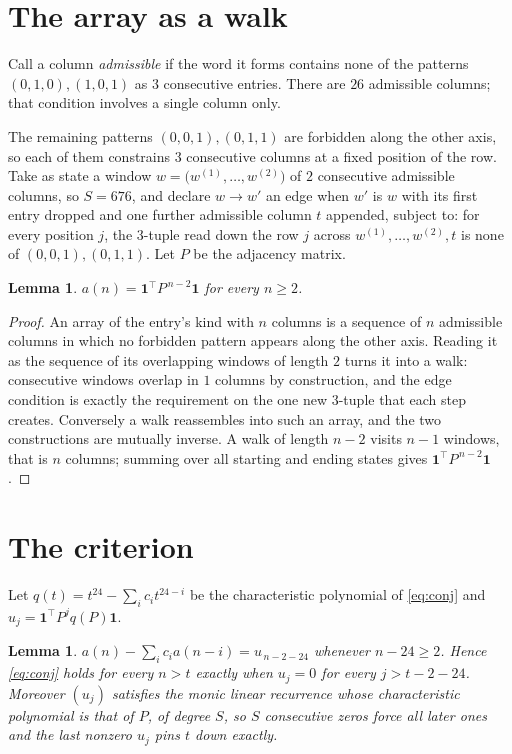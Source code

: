 \documentclass[11pt,a4paper]{article}
\theoremstyle{plain}
\newtheorem{lemma}[theorem]{Lemma}
\theoremstyle{definition}
\begin{document}
\section{The array as a walk}

Call a column \emph{admissible} if the word it forms contains none of the patterns
$(0,1,0), (1,0,1)$ as $3$ consecutive entries. There are $26$ admissible columns; that condition
involves a single column only.

The remaining patterns $(0,0,1), (0,1,1)$ are forbidden along the other axis, so each of them
constrains $3$ consecutive columns at a fixed position of the row. Take as state a
window $w=\bigl(w^{(1)},\dots,w^{(2)}\bigr)$ of $2$ consecutive admissible
columns, so $S=676$, and declare $w\to w'$ an edge when $w'$ is $w$ with its first entry
dropped and one further admissible column $t$ appended, subject to: for every position
$j$, the $3$-tuple read down the row $j$ across $w^{(1)},\dots,w^{(2)},t$
is none of $(0,0,1), (0,1,1)$. Let $P$ be the adjacency matrix.

\begin{lemma}\label{lem:walk}
$a(n)=\mathbf{1}^{\!\top}P^{\,n-2}\mathbf{1}$ for every $n\ge2$.
\end{lemma}

\begin{proof}
An array of the entry's kind with $n$ columns is a sequence of $n$ admissible columns in
which no forbidden pattern appears along the other axis. Reading it as the sequence of its
overlapping windows of length $2$ turns it into a walk: consecutive windows overlap in
$1$ columns by construction, and the edge condition is exactly the requirement on the one
new $3$-tuple that each step creates. Conversely a walk reassembles into such an array,
and the two constructions are mutually inverse. A walk of length $n-2$ visits $n-1$
windows, that is $n$ columns; summing over all starting and ending states gives
$\mathbf{1}^{\!\top}P^{\,n-2}\mathbf{1}$.
\end{proof}

\section{The criterion}

Let $q(t)=t^{24}-\sum_i c_i t^{24-i}$ be the characteristic polynomial of
\eqref{eq:conj} and $u_j=\mathbf{1}^{\!\top}P^{j}q(P)\mathbf{1}$.

\begin{lemma}\label{lem:crit}
$a(n)-\sum_i c_i a(n-i)=u_{\,n-2-24}$ whenever $n-24\ge2$. Hence
\eqref{eq:conj} holds for every $n>t$ exactly when $u_j=0$ for every
$j>t-2-24$. Moreover $(u_j)$ satisfies the monic linear recurrence whose
characteristic polynomial is that of $P$, of degree $S$, so $S$ consecutive zeros force all
later ones and the last nonzero $u_j$ pins $t$ down exactly.
\end{lemma}
\end{document}
